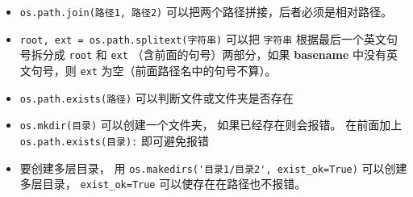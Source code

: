 \begin{itemize}
\item \verb`os.path.join(路径1, 路径2)` 可以把两个路径拼接，后者必须是相对路径。
\item \verb`root, ext = os.path.splitext(字符串)` 可以把 \verb`字符串` 根据最后一个英文句号拆分成 \verb`root` 和 \verb`ext` （含前面的句号）两部分，如果 \textbf{basename} 中没有英文句号，则 \verb`ext` 为空（前面路径名中的句号不算）。
\item \verb`os.path.exists(路径)` 可以判断文件或文件夹是否存在
\item \verb`os.mkdir(目录)` 可以创建一个文件夹， 如果已经存在则会报错。 在前面加上 \verb`os.path.exists(目录):` 即可避免报错
\item 要创建多层目录， 用 \verb`os.makedirs('目录1/目录2', exist_ok=True)` 可以创建多层目录， \verb`exist_ok=True` 可以使存在在路径也不报错。
\end{itemize}
